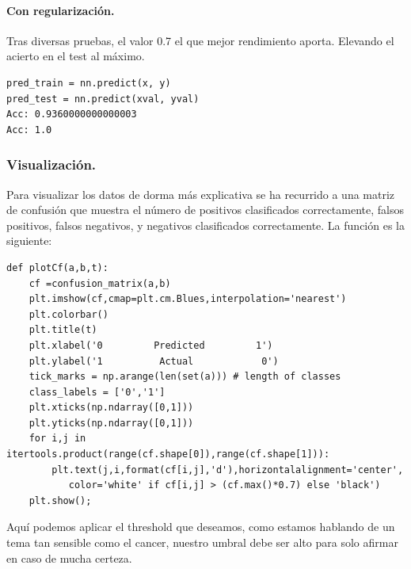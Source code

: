 \documentclass[a4paper,10pt]{article}
\begin{document}
\paragraph{Con regularización.}
Tras diversas pruebas, el valor 0.7 el que mejor rendimiento aporta. Elevando el acierto en el test al máximo.
\begin{lstlisting}
pred_train = nn.predict(x, y)
pred_test = nn.predict(xval, yval)
Acc: 0.9360000000000003
Acc: 1.0
\end{lstlisting}
\subsubsection{Visualización.}
Para visualizar los datos de dorma más explicativa se ha recurrido a una matriz de confusión que muestra el número de positivos clasificados correctamente, falsos positivos, falsos negativos, y  negativos clasificados correctamente. La función es la siguiente:
\begin{lstlisting}
def plotCf(a,b,t):
    cf =confusion_matrix(a,b)
    plt.imshow(cf,cmap=plt.cm.Blues,interpolation='nearest')
    plt.colorbar()
    plt.title(t)
    plt.xlabel('0         Predicted         1')
    plt.ylabel('1          Actual            0')
    tick_marks = np.arange(len(set(a))) # length of classes
    class_labels = ['0','1']
    plt.xticks(np.ndarray([0,1]))
    plt.yticks(np.ndarray([0,1]))
    for i,j in itertools.product(range(cf.shape[0]),range(cf.shape[1])):
        plt.text(j,i,format(cf[i,j],'d'),horizontalalignment='center',
           color='white' if cf[i,j] > (cf.max()*0.7) else 'black')
    plt.show();
\end{lstlisting}
Aquí podemos aplicar el threshold que deseamos, como estamos hablando de un tema tan sensible como el cancer, nuestro umbral debe ser alto para solo afirmar en caso de mucha certeza.
\end{document}

